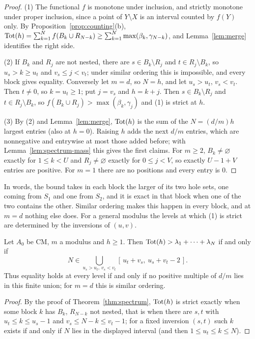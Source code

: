 \begin{proof}
(1) The functional $f$ is monotone under inclusion, and strictly monotone under proper inclusion, since a point of $Y\setminus X$ is an interval counted by $f(Y)$ only. By Proposition~\ref{prop:counting}(b), $\operatorname{Tot}(h)=\sum_{k=1}^{N}f(B_k\cup R_{N-k})\ge\sum_{k=1}^{N}\max(\beta_k,\gamma_{N-k})$, and Lemma~\ref{lem:merge} identifies the right side.

(2) If $B_k$ and $R_j$ are not nested, there are $s\in B_k\setminus R_j$ and $t\in R_j\setminus B_k$, so $u_s>k\ge u_t$ and $v_s\le j<v_t$; under similar ordering this is impossible, and every block gives equality. Conversely let $m=d$, so $N=h$, and let $u_s>u_t$, $v_s<v_t$. Then $t\ne0$, so $k=u_t\ge1$; put $j=v_s$ and $h=k+j$. Then $s\in B_k\setminus R_j$ and $t\in R_j\setminus B_k$, so $f(B_k\cup R_j)>\max(\beta_k,\gamma_j)$ and (1) is strict at $h$.

(3) By (2) and Lemma~\ref{lem:merge}, $\operatorname{Tot}(h)$ is the sum of the $N=(d/m)h$ largest entries (also at $h=0$). Raising $h$ adds the next $d/m$ entries, which are nonnegative and entrywise at most those added before; with Lemma~\ref{lem:spectrum-mass} this gives the first claims. For $m\ge2$, $B_k\neq\varnothing$ exactly for $1\le k<U$ and $R_j\ne\varnothing$ exactly for $0\le j<V$, so exactly $U-1+V$ entries are positive. For $m=1$ there are no positions and every entry is $0$.
\end{proof}

In words, the bound takes in each block the larger of its two hole sets, one coming from $S_1$ and one from $S_2$, and it is exact in that block when one of the two contains the other. Similar ordering makes this happen in every block, and at $m=d$ nothing else does. For a general modulus the levels at which (1) is strict are determined by the inversions of $(u,v)$.

\begin{proposition}\label{prop:strict-levels}
Let $A_0$ be CM, $m$ a modulus and $h\ge1$. Then $\operatorname{Tot}(h)>\lambda_1+\dots+\lambda_N$ if and only if
\[
N\in\bigcup_{u_s>u_t,\ v_s<v_t}[\,u_t+v_s,\ u_s+v_t-2\,].
\]
Thus equality holds at every level if and only if no positive multiple of $d/m$ lies in this finite union; for $m=d$ this is similar ordering.
\end{proposition}

\begin{proof}
By the proof of Theorem~\ref{thm:spectrum}, $\operatorname{Tot}(h)$ is strict exactly when some block $k$ has $B_k$, $R_{N-k}$ not nested, that is when there are $s,t$ with $u_t\le k\le u_s-1$ and $v_s\le N-k\le v_t-1$; for a fixed inversion $(s,t)$ such $k$ exists if and only if $N$ lies in the displayed interval (and then $1\le u_t\le k\le N$).
\end{proof}


